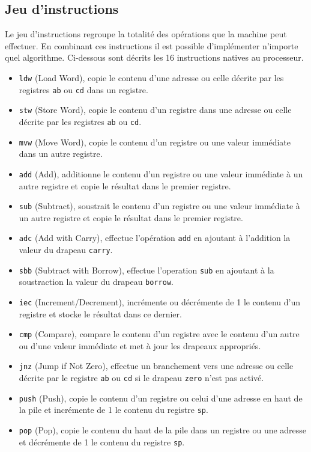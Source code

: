 \documentclass{article}
\begin{document}
\subsection{Jeu d'instructions}
Le jeu d'instructions regroupe la totalité des opérations que la machine peut effectuer. En combinant ces instructions il est possible d'implémenter n'importe quel algorithme. Ci-dessous sont décrits les 16 instructions natives au processeur.
\begin{itemize}
    \item \texttt{ldw} (Load Word), copie le contenu d'une adresse ou celle décrite par les registres \texttt{ab} ou \texttt{cd} dans un registre.
    \item \texttt{stw} (Store Word), copie le contenu d'un registre dans une adresse ou celle décrite par les registres \texttt{ab} ou \texttt{cd}.
    \item \texttt{mvw} (Move Word), copie le contenu d'un registre ou une valeur immédiate dans un autre registre.
    \item \texttt{add} (Add), additionne le contenu d'un registre ou une valeur immédiate à un autre registre et copie le résultat dans le premier registre.
    \item \texttt{sub} (Subtract), soustrait le contenu d'un registre ou une valeur immédiate à un autre registre et copie le résultat dans le premier registre.
    \item \texttt{adc} (Add with Carry), effectue l'opération \texttt{add} en ajoutant à l'addition la valeur du drapeau \texttt{carry}.
    \item \texttt{sbb} (Subtract with Borrow), effectue l'operation \texttt{sub} en ajoutant à la soustraction la valeur du drapeau \texttt{borrow}.
    \item \texttt{iec} (Increment/Decrement), incrémente ou décrémente de 1 le contenu d'un registre et stocke le résultat dans ce dernier.
    \item \texttt{cmp} (Compare), compare le contenu d'un registre avec le contenu d'un autre ou d'une valeur immédiate et met à jour les drapeaux appropriés.
    \item \texttt{jnz} (Jump if Not Zero), effectue un branchement vers une adresse ou celle décrite par le registre \texttt{ab} ou \texttt{cd} si le drapeau \texttt{zero} n'est pas activé.
    \item \texttt{push} (Push), copie le contenu d'un registre ou celui d'une adresse en haut de la pile et incrémente de 1 le contenu du registre \texttt{sp}.
    \item \texttt{pop} (Pop), copie le contenu du haut de la pile dans un registre ou une adresse et décrémente de 1 le contenu du registre \texttt{sp}.

\end{itemize}
\end{document}
